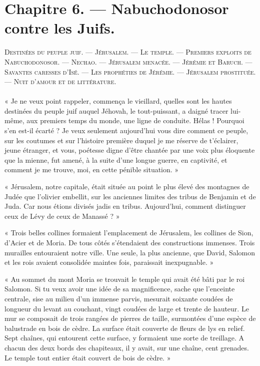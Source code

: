\documentclass[a4paper, 11pt, oneside, polutonikogreek, french]{article}
\begin{document}
\section{Chapitre 6. --- Nabuchodonosor contre les Juifs.}
\begin{center}
\scshape
\small
Destinées du peuple juif. --- Jérusalem. --- Le temple. --- Premiers exploits de Nabuchodonosor. --- Nechao. --- Jérusalem menacée. --- Jérémie et Baruch. --- Savantes caresses d'Isé. --- Les prophéties de Jérémie. --- Jérusalem prostituée. --- Nuit d'amour et de littérature.
\end{center}
\paragraph{}
« Je ne veux point rappeler, commença le vieillard, quelles sont les hautes destinées du peuple juif auquel Jéhovah, le tout-puissant, a daigné tracer lui-même, aux premiers temps du monde, une ligne de conduite. Hélas ! Pourquoi s'en est-il écarté ? Je veux seulement aujourd'hui vous dire comment ce peuple, sur les coutumes et sur l'histoire première duquel je me réserve de t'éclairer, jeune étranger, et vous, poétesse digne d'être chantée par une voix plus éloquente que la mienne, fut amené, à la suite d'une longue guerre, en captivité, et comment je me trouve, moi, en cette pénible situation. »

« Jérusalem, notre capitale, était située au point le plus élevé des montagnes de Judée que l'olivier embellit, sur les anciennes limites des tribus de Benjamin et de Juda. Car nous étions divisés jadis en tribus. Aujourd'hui, comment distinguer ceux de Lévy de ceux de Manassé ? »

« Trois belles collines formaient l'emplacement de Jérusalem, les collines de Sion, d'Acier et de Moria. De tous côtés s'étendaient des constructions immenses. Trois murailles entouraient notre ville. Une seule, la plus ancienne, que David, Salomon et les rois avaient consolidée maintes fois, paraissait inexpugnable. »

« Au sommet du mont Moria se trouvait le temple qui avait été bâti par le roi Salomon. Si tu veux avoir une idée de sa magnificence, sache que l'enceinte centrale, sise au milieu d'un immense parvis, mesurait soixante coudées de longueur du levant au couchant, vingt coudées de large et trente de hauteur. Le mur se composait de trois rangées de pierres de taille, surmontées d'une espèce de balustrade en bois de cèdre. La surface était couverte de fleurs de lys en relief. Sept chaînes, qui entourent cette surface, y formaient une sorte de treillage. A chacun des deux bords des chapiteaux, il y avait, sur une chaîne, cent grenades. Le temple tout entier était couvert de bois de cèdre. »
\end{document}
